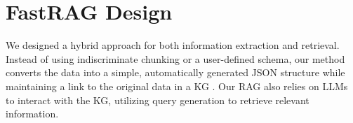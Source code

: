 \documentclass[conference]{IEEEtran}
\begin{document}




\section{FastRAG Design}\label{design}
We designed a hybrid approach for both information extraction and retrieval. 
Instead of using indiscriminate chunking or a user-defined schema, our method converts the data into a simple, automatically generated JSON structure while maintaining a link to the original data in a KG \cite{khorashadizadeh2024RTrendsLlmKg}. Our RAG also relies on LLMs to interact with the KG, utilizing query generation to retrieve relevant information.
\end{document}
